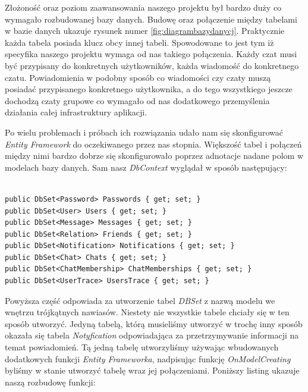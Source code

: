 \documentclass[12pt,a4paper]{article}
\begin{document}
\hspace*{0.7cm} Złożoność oraz poziom zaawansowania naszego projektu był bardzo duży co wymagało rozbudowanej bazy danych. Budowę oraz połączenie między tabelami w bazie danych ukazuje rysunek numer \ref{fig:diagrambazydanycj}. Praktycznie każda tabela posiada klucz obcy innej tabeli. Spowodowane to jest tym iż specyfika naszego projektu wymaga od nas takiego połączenia. Każdy czat musi być przypisany do konkretnych użytkowników, każda wiadomość do konkretnego czatu. Powiadomienia w podobny sposób co wiadomości czy czaty muszą posiadać przypisanego konkretnego użytkownika, a do tego wszystkiego jeszcze dochodzą czaty grupowe co wymagało od nas dodatkowego przemyślenia działania całej infrastruktury aplikacji.\newline

\hspace*{0.7cm} Po wielu problemach i próbach ich rozwiązania udało nam się skonfigurować \textit{Entity Framework} do oczekiwanego przez nas stopnia. Większość tabel i połączeń między nimi bardzo dobrze się skonfigurowało poprzez adnotacje nadane polom w modelach bazy danych. Sam nasz \textit{DbContext} wyglądał w sposób następujący:\newline

\begin{lstlisting}[caption={DbContext Entity Framework}]

public DbSet<Password> Passwords { get; set; }
public DbSet<User> Users { get; set; }
public DbSet<Message> Messages { get; set; }
public DbSet<Relation> Friends { get; set; }
public DbSet<Notification> Notifications { get; set; }
public DbSet<Chat> Chats { get; set; }
public DbSet<ChatMembership> ChatMemberships { get; set; }
public DbSet<UserTrace> UsersTrace { get; set; }

\end{lstlisting}

\hspace*{0.7cm} Powyższa część odpowiada za utworzenie tabel \textit{DBSet} z nazwą modelu we wnętrzu trójkątnych nawiasów. Niestety nie wszystkie tabele chciały się w ten sposób utworzyć. Jedyną tabelą, którą musieliśmy utworzyć w trochę inny sposób okazała się tabela \textit{Notyfication} odpowiadająca za przetrzymywanie informacji na temat powiadomień. Tą jedną tabelę utworzyliśmy używając wbudowanych dodatkowych funkcji \textit{Entity Frameworka}, nadpisując funkcję \textit{OnModelCreating} byliśmy w stanie utworzyć tabelę wraz jej połączeniami. Poniższy listing ukazuje naszą rozbudowę funkcji:\newline
\end{document}
